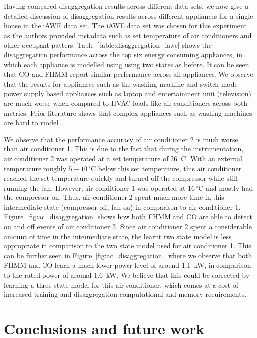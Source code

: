 \documentclass{sig-alternate}
\newcommand{\figref}[1]{Figure~\ref{#1}}
\newcommand{\tabref}[1]{Table~\ref{#1}}
\begin{document}
\noindent
Having compared disaggregation results across different data sets, we now give a detailed discussion of disaggregation results across different appliances for a single house in the iAWE data set. The iAWE data set was chosen for this experiment as the authors provided metadata such as set temperature of air conditioners and other occupant patters. \tabref{table:disaggregation_iawe} shows the disaggregation performance across the top six energy consuming appliances, in which each appliance is modelled using using two states as before. It can be seen that CO and FHMM report similar performance across all appliances. We observe that the results for appliances such as the washing machine and switch mode power supply based appliances such as laptop and entertainment unit (television) are much worse when compared to HVAC loads like air conditioners across both metrics. Prior literature shows that complex appliances such as washing machines are hard to model~\cite{barker_2013}.

We observe that the performance accuracy of air conditioner 2 is much worse than air conditioner 1. This is due to the fact that during the instrumentation, air conditioner 2 was operated at a set temperature of $26\,^{\circ}\mathrm{C}$. With an external temperature roughly $5-10\,^{\circ}\mathrm{C}$ below this set temperature, this air conditioner reached the set temperature quickly and turned off the compressor while still running the fan. However, air conditioner 1 was operated at $16\,^{\circ}\mathrm{C}$ and mostly had the compressor on. Thus, air conditioner 2 spent much more time in this intermediate state (compressor off, fan on) in comparison to air conditioner 1. \figref{fig:ac_disaggregation} shows how both FHMM and CO are able to detect on and off events of air conditioner 2. Since air conditioner 2 spent a considerable amount of time in the intermediate state, the learnt two state model is less appropriate in comparison to the two state model used for air conditioner 1. This can be further seen in \figref{fig:ac_disaggregation}, where we observe that both FHMM and CO learn a much lower power level of around 1.1~kW, in comparison to the rated power of around 1.6~kW. We believe that this could be corrected by learning a three state model for this air conditioner, which comes at a cost of increased training and disaggregation computational and memory requirements.


\section{Conclusions and future work}
\label{sec:conclusions}
\end{document}
